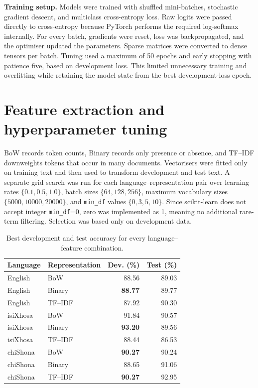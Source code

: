 \documentclass[10pt,a4paper]{article}
\begin{document}
\textbf{Training setup.}
Models were trained with shuffled mini-batches, stochastic gradient descent, and multiclass cross-entropy loss. Raw logits were passed directly to cross-entropy because PyTorch performs the required log-softmax internally. For every batch, gradients were reset, loss was backpropagated, and the optimiser updated the parameters. Sparse matrices were converted to dense tensors per batch. Tuning used a maximum of 50 epochs and early stopping with patience five, based on development loss. This limited unnecessary training and overfitting while retaining the model state from the best development-loss epoch.

\section{Feature extraction and hyperparameter tuning}

BoW records token counts, Binary records only presence or absence, and TF--IDF downweights tokens that occur in many documents. Vectorisers were fitted only on training text and then used to transform development and test text. A separate grid search was run for each language--representation pair over learning rates $\{0.1,0.5,1.0\}$, batch sizes $\{64,128,256\}$, maximum vocabulary sizes $\{5000,10000,20000\}$, and \texttt{min\_df} values $\{0,3,5,10\}$. Since scikit-learn does not accept integer \texttt{min\_df}=0, zero was implemented as 1, meaning no additional rare-term filtering. Selection was based only on development data.

\begin{table}[htbp]
\centering
\small
\caption{Best development and test accuracy for every language--feature combination.}
\begin{tabular}{llrr}
\toprule
Language & Representation & Dev. (\%) & Test (\%)\\
\midrule
English & BoW & 88.56 & 89.03\\
English & Binary & \textbf{88.77} & 89.77\\
English & TF--IDF & 87.92 & 90.30\\
\midrule
isiXhosa & BoW & 91.84 & 90.57\\
isiXhosa & Binary & \textbf{93.20} & 89.56\\
isiXhosa & TF--IDF & 88.44 & 86.53\\
\midrule
chiShona & BoW & \textbf{90.27} & 90.24\\
chiShona & Binary & 88.65 & 91.06\\
chiShona & TF--IDF & \textbf{90.27} & 92.95\\
\bottomrule
\end{tabular}
\end{table}
\end{document}
